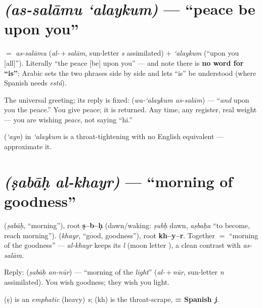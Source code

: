 \section{ \emph{(as-sal\=amu `alaykum)} --- ``peace be upon you''}
\label{lesson:as-salamu-alaykum}

 $=$ \emph{as-sal\=amu} (\emph{al-}\,+\,\emph{sal\=am}, sun-letter
\emph{s} assimilated) $+$ \emph{`alaykum} (``upon you [all]''). Literally ``the
peace [be] upon you'' --- and note there is \textbf{no word for ``is''};
Arabic sets the two phrases side by side and lets ``is'' be understood (where
Spanish needs \emph{est\'{a}}).

\begin{culture}
The universal greeting; its reply is fixed:  (\emph{wa-`alaykum
as-sal\=am}) --- ``\emph{and} upon you the peace.'' You give peace; it is
returned. Any time, any register, real weight --- you are wishing \emph{peace},
not saying ``hi.''
\end{culture}

\begin{sounds}
 (\emph{`ayn}) in \emph{`alaykum} is a throat-tightening with no English
equivalent --- approximate it.
\end{sounds}

\section{ \emph{(\d{s}ab\=a\d{h} al-khayr)} --- ``morning of goodness''}
\label{lesson:sabah-al-khayr}

\begin{cousinweb}
 (\emph{\d{s}ab\=a\d{h}}, ``morning''), root \textbf{\d{s}--b--\d{h}}
(dawn/waking: \emph{\d{s}ub\d{h}} dawn, \emph{a\d{s}ba\d{h}a} ``to become,
reach morning'').  (\emph{khayr}, ``good, goodness''), root
\textbf{kh--y--r}. Together  $=$ ``morning of the goodness'' ---
\emph{al-khayr} keeps its \emph{l} (moon letter ), a clean contrast with
\emph{as-sal\=am}.
\end{cousinweb}

\begin{culture}
Reply:  (\emph{\d{s}ab\=a\d{h} an-n\=ur}) --- ``morning of the
\emph{light}'' (\emph{al-}\,+\,\emph{n\=ur}, sun-letter \emph{n} assimilated).
You wish goodness; they wish you light.
\end{culture}

\begin{sounds}
 (\d{s}) is an \emph{emphatic} (heavy) \emph{s};  (kh) is the
throat-scrape, \textbf{= Spanish \emph{j}}.
\end{sounds}

